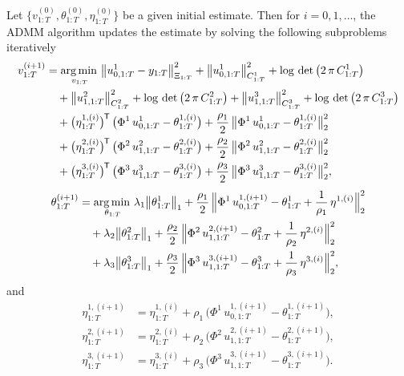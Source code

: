 \begin{algorithm}
	\label{alg:admm}
	Let $\big\lbrace v^{(0)}_{1:T}, \theta^{(0)}_{1:T}, \eta^{(0)}_{1:T}\big\rbrace$ be a given initial estimate. Then for $i=0,1,\ldots$, the ADMM algorithm updates the estimate by solving the following subproblems iteratively
	\begin{align}
		v^{(i+1)}_{1:T} &= \operatorname*{arg\,min\,}_{v_{1:T}} \big \lVert u^1_{0, 1:T} - y_{1:T} \big \rVert^2_{\Xi_{1:T}} + \big \lVert u^1_{0, 1:T} \big \rVert^2_{C^1_{1:T}} + \log \,\det\big(2 \, \pi \, C^1_{1:T}\big) \nonumber\\
		&\quad+ \big \lVert u^2_{1, 1:T} \big \rVert^2_{C^2_{1:T}} + \log \,\det\big(2 \, \pi \, C^2_{1:T}\big) + \big \lVert u^3_{1, 1:T} \big \rVert^2_{C^3_{1:T}} + \log \,\det\big(2 \, \pi \, C^3_{1:T}\big) \nonumber\\
		&\quad+ \big(\eta^{1, (i)}_{1:T}\big)^{\mkern-1.5mu\mathsf{T}} \, \big(\Phi^1 \, u^1_{0,1:T} - \theta^{1, (i)}_{1:T}\big) + \frac{\rho_1}{2}  \, \big \lVert \Phi^1 \, u^1_{0,1:T} - \theta^{1, (i)}_{1:T} \big \rVert^2_2 \label{equ:r-dgp-sub-f}\\
		&\quad+ \big(\eta^{2, (i)}_{1:T}\big)^{\mkern-1.5mu\mathsf{T}} \, \big(\Phi^2 \, u^2_{1,1:T} - \theta^{2, (i)}_{1:T}\big) + \frac{\rho_2}{2}  \, \big \lVert \Phi^2 \, u^2_{1,1:T} - \theta^{2, (i)}_{1:T} \big \rVert^2_2 \nonumber\\
		&\quad+ \big(\eta^{3, (i)}_{1:T}\big)^{\mkern-1.5mu\mathsf{T}} \, \big(\Phi^3 \, u^3_{1,1:T} - \theta^{3, (i)}_{1:T}\big) + \frac{\rho_3}{2} \,  \big \lVert \Phi^3 \, u^3_{1,1:T} - \theta^{3, (i)}_{1:T} \big \rVert^2_2, \nonumber
	\end{align}
	\begin{equation}
		\begin{split}
			\theta^{(i+1)}_{1:T} &= \operatorname*{arg\,min\,}_{\theta_{1:T}} \lambda_1 \big \lVert \theta^1_{1:T} \big \rVert_1 + \frac{\rho_1}{2}  \, \Big \lVert \Phi^1 \, u^{1, (i+1)}_{0,1:T} - \theta^1_{1:T} + \frac{1}{\rho_1}\,\eta^{1, (i)} \Big\rVert_2^2\\
			&\quad+ \lambda_2 \big \lVert \theta^2_{1:T} \big \rVert_1 + \frac{\rho_2}{2} \,  \Big \lVert \Phi^2 \, u^{2, (i+1)}_{1,1:T} - \theta^2_{1:T} + \frac{1}{\rho_2}\,\eta^{2, (i)} \Big\rVert_2^2\\
			&\quad+ \lambda_3 \big \lVert \theta^3_{1:T} \big \rVert_1 + \frac{\rho_3}{2} \,  \Big \lVert \Phi^3 \, u^{3, (i+1)}_{1,1:T} - \theta^3_{1:T} + \frac{1}{\rho_3}\,\eta^{3, (i)} \Big\rVert_2^2,
			\label{equ:r-dgp-sub-theta}
		\end{split}
	\end{equation}
	and
	\begin{equation}
		\begin{split}
			\eta^{1, (i+1)}_{1:T} &= \eta^{1, (i)}_{1:T} + \rho_1\, \big( \Phi^1 \, u^{1, (i+1)}_{0,1:T} - \theta^{1, (i+1)}_{1:T} \big), \\
			\eta^{2, (i+1)}_{1:T} &= \eta^{2, (i)}_{1:T} + \rho_2\, \big( \Phi^2 \, u^{2, (i+1)}_{1,1:T} - \theta^{2, (i+1)}_{1:T} \big), \\
			\eta^{3, (i+1)}_{1:T} &= \eta^{3, (i)}_{1:T} + \rho_3\, \big( \Phi^3 \, u^{3, (i+1)}_{1,1:T} - \theta^{3, (i+1)}_{1:T} \big). 
		\end{split}
	\end{equation}
\end{algorithm}


